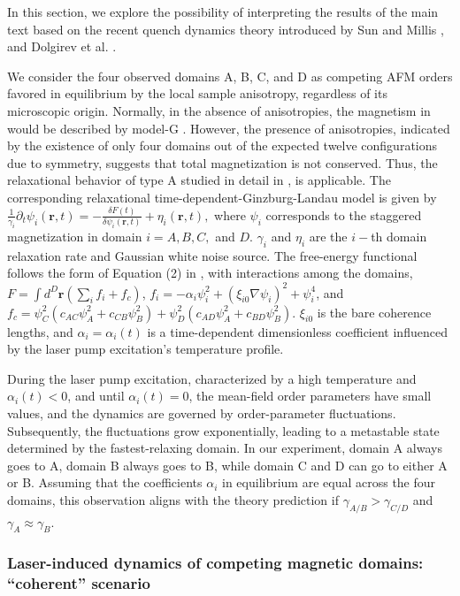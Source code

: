 In this section, we explore the possibility of interpreting the results of the main text based on the recent quench dynamics theory introduced by Sun and Millis \citep{sun_transient_2020}, and Dolgirev et al. \citep{dolgirev_self-similar_2020}.  

We consider the four observed domains A, B, C, and D as competing AFM orders favored in equilibrium by the local sample anisotropy, regardless of its microscopic origin.
Normally, in the absence of anisotropies, the magnetism in \cmb would be described by model-G \citep{hohenberg1977}.
However, the presence of anisotropies, indicated by the existence of only four domains out of the expected twelve configurations due to symmetry, suggests that total magnetization is not conserved.
Thus, the relaxational behavior of type A studied in detail in \citep{sun_transient_2020,dolgirev_self-similar_2020}, is applicable.
The corresponding relaxational time-dependent-Ginzburg-Landau model is given by $\frac{1}{\gamma_i} \partial_t \psi_i(\mathbf{r}, t)=-\frac{\delta F(t)}{\delta \psi_i(\mathbf{r}, t)}+\eta_i(\mathbf{r}, t),$ where $\psi_i$ corresponds to the staggered magnetization in domain $i=A,B,C,$ and $D.$ $\gamma_i$ and $\eta_i$ are the $i-$th domain relaxation rate and Gaussian white noise source.
The free-energy functional follows the form of Equation (2) in \citep{sun_transient_2020}, with interactions among the domains, $F = \int d^D\mathbf{r} \left(\sum_i f_i+f_c \right)$, $f_i=-\alpha_i \psi_i^2+\left(\xi_{i 0} \nabla \psi_i\right)^2+\psi_i^4$, and $f_c =   \psi^2_C (c_{AC}\psi^2_A+c_{CB}\psi^2_B) + \psi^2_D (c_{AD}\psi^2_A+c_{BD}\psi^2_B)$.
$\xi_{i 0}$ is the bare coherence lengths, and $\alpha_i = \alpha_i(t)$ is a time-dependent dimensionless coefficient influenced by the laser pump excitation's temperature profile.

During the laser pump excitation, characterized by a high temperature and $\alpha_i(t)<0$, and until $\alpha_i(t)=0$, the mean-field order parameters have small values, and the dynamics are governed by order-parameter fluctuations.
Subsequently, the fluctuations grow exponentially, leading to a metastable state determined by the fastest-relaxing domain.
In our experiment, domain A always goes to A, domain B always goes to B, while domain C and D can go to either A or B.
Assuming that the coefficients $\alpha_i$ in equilibrium are equal across the four domains, this observation aligns with the theory prediction if $\gamma_{A/B} > \gamma_{C/D}$ and $\gamma_A \approx \gamma_B$.

\subsubsection{Laser-induced dynamics of competing magnetic domains: ``coherent'' scenario}\label{cmb-sec:nonequilibriumtheory}

